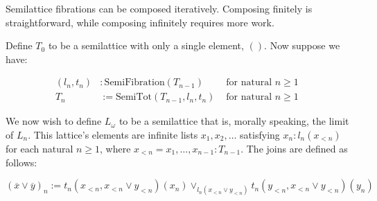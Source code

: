 \documentclass{article}
\begin{document}
      Semilattice fibrations can be composed iteratively. Composing finitely is straightforward, while composing infinitely requires more work.

      Define $T_0$ to be a semilattice with only a single element, $()$. Now suppose we have:

      \begin{align*}
        (l_n, t_n) &: \mathrm{SemiFibration}(T_{n-1}) & \text{ for natural $n \geq 1$ } \\
        T_n &:= \mathrm{SemiTot}(T_{n-1}, l_n, t_n)    & \text{ for natural $n \geq 1$ }
      \end{align*}

      We now wish to define $L_\omega$ to be a semilattice that is, morally speaking, the limit of $L_n$. This lattice's elements are infinite lists $x_1, x_2, \ldots$ satisfying $x_n : l_n(x_{<n})$ for each natural $n \geq 1$, where $x_{<n} = x_1, \ldots, x_{n-1} : T_{n-1}$. The joins are defined as follows:

      $$(\overline{x} \vee \overline{y})_n := t_n(x_{<n}, x_{<n} \vee y_{<n})(x_n) \vee_{l_n(x_{<n} \vee y_{<n})} t_n(y_{<n}, x_{<n} \vee y_{<n})(y_n)$$
\end{document}
